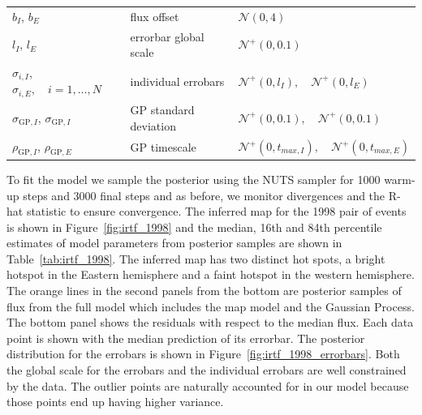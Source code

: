 \documentclass[modern]{aastex62}
\begin{document}
\begin{table}[t!]
\begin{center}
\begin{longtable}{W{l}{4cm} W{l}{4cm} W{l}{6cm}}
            \\
    $b_I$, $b_E$& flux offset &$\mathcal{N}(0, 4)$
            \\
            $l_I$, $l_E$& errorbar global scale&$\mathcal{N}^+(0,0.1)$
            \\
            $\sigma_{i,I}$, $\sigma_{i,E},\quad i=1,\dots,N$& individual errobars&
            $\mathcal{N}^+(0,l_I),\quad \mathcal{N}^+(0,l_E)$
            \\
            $\sigma_{\mathrm{GP}, I}$, $\sigma_{\mathrm{GP}, I}$ & GP standard deviation&$\mathcal{N}^+(0,0.1),\quad \mathcal{N}^+(0,0.1)$
            \\
            $\rho_{\mathrm{GP},I}$, $\rho_{\mathrm{GP},E}$ & GP timescale  & $\mathcal{N}^+(0, t_{max, I}),\quad  \mathcal{N}^+(0, t_{max, E})$
        \\
        \end{longtable}
    \end{center}
\end{table}

To fit the model we sample the posterior using the NUTS sampler for 1000 warm-up steps and 3000 final steps and as before, we monitor divergences and the R-hat statistic to ensure convergence.
The inferred map for the 1998 pair of events is shown in Figure~\ref{fig:irtf_1998} and the median, 16th and 84th percentile estimates of model parameters from posterior samples are shown in Table~\ref{tab:irtf_1998}. 
The inferred map has two distinct hot spots, a bright hotspot in the Eastern hemisphere and a faint hotspot in the western hemisphere.
The orange lines in the second panels from the bottom are posterior samples of flux from the full model which includes the map model and the Gaussian Process.
The bottom panel shows the residuals with respect to the median flux.
Each data point is shown with the median prediction of its errorbar.
The posterior distribution for the errobars is shown in Figure~\ref{fig:irtf_1998_errorbars}.
Both the global scale for the errobars and the individual errobars are well constrained by the data. 
The outlier points are naturally accounted for in our model because those points end up having higher variance.
\end{document}
